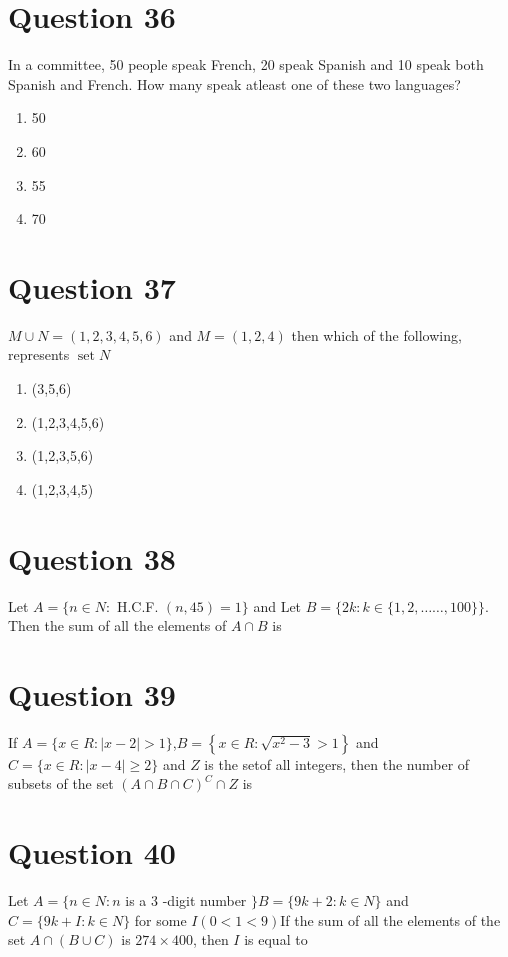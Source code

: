 \documentclass{article}
\begin{document}
\section*{Question 36}
In a committee, 50 people speak French, 20 speak Spanish and 10 speak both Spanish and French. How many speak atleast one of these two languages?\newline
\begin{enumerate}[label=(\alph*)]
\item 50
\item 60
\item 55
\item 70
\end{enumerate}
\newpage
\section*{Question 37}
\(M \cup N=(1,2,3,4,5,6)\) and \(M=(1,2,4)\) then which of the following, represents \(\operatorname{set} N\)\newline
\begin{enumerate}[label=(\alph*)]
\item (3,5,6)
\item (1,2,3,4,5,6)
\item (1,2,3,5,6)\newline
\item (1,2,3,4,5)\newline
\end{enumerate}
\newpage
\section*{Question 38}
Let \(A=\{n \in N:\) H.C.F. \((n, 45)=1\}\) and Let \(B=\{2 k: k \in\{1,2, \ldots \ldots, 100\}\}\). Then the sum of all the elements of \(A \cap B\) is 
\begin{enumerate}[label=(\alph*)]
\end{enumerate}
\newpage
\section*{Question 39}
If \(A=\{x \in R:|x-2|>1\}\),\(B=\left\{x \in R: \sqrt{x^2-3}>1\right\}\) and\(C=\{x \in R:|x-4| \geq 2\}\) and \(Z\) is the setof all integers, then the number of subsets of the set \((A \cap B \cap C)^C \cap Z\) is   
\begin{enumerate}[label=(\alph*)]
\end{enumerate}
\newpage
\section*{Question 40}
Let \(A=\{n \in N: n\) is a 3 -digit number \(\} B=\{9 k+2: k \in N\}\) and \(C=\{9 k+I: k \in N\}\) for some \(I(0<1<9)\)If the sum of all the elements of the set \(A \cap(B \cup C)\) is \(274 \times 400\), then \(I\) is equal to
\begin{enumerate}[label=(\alph*)]
\end{enumerate}
\newpage
\end{document}
